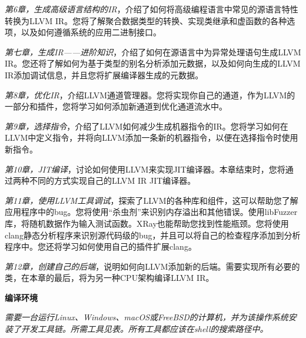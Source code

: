 \textit{第6章，生成高级语言结构的IR}，介绍了如何将高级编程语言中常见的源语言特性转换为LLVM IR。您将了解聚合数据类型的转换、实现类继承和虚函数的各种选项，以及如何遵循系统的应用二进制接口。\par

\textit{第七章，生成IR——进阶知识}，介绍了如何在源语言中为异常处理语句生成LLVM IR。您还将了解如何为基于类型的别名分析添加元数据，以及如何向生成的LLVM IR添加调试信息，并且您将扩展编译器生成的元数据。\par

\textit{第8章，优化IR}，介绍LLVM通道管理器。您将实现你自己的通道，作为LLVM的一部分和插件，您将学习如何添加新通道到优化通道流水中。\par

\textit{第9章，选择指令}，介绍了LLVM如何减少生成机器指令的IR。您将学习如何在LLVM中定义指令，并将向LLVM添加一条新的机器指令，以便在选择指令时使用新指令。\par

\textit{第10章，JIT编译}，讨论如何使用LLVM来实现JIT编译器。本章结束时，您将通过两种不同的方式实现自己的LLVM IR JIT编译器。\par

\textit{第11章，使用LLVM工具调试}，探索了LLVM的各种库和组件，这可以帮助您了解应用程序中的bug。您将使用“杀虫剂”来识别内存溢出和其他错误。使用libFuzzer库，将随机数据作为输入测试函数。XRay也能帮助您找到性能瓶颈。您将使用clang静态分析程序来识别源代码级的bug，并且可以将自己的检查程序添加到分析程序中。您还将学习如何使用自己的插件扩展clang。\par

\textit{第12章，创建自己的后端}，说明如何向LLVM添加新的后端。需要实现所有必要的类，在本章的最后，将为另一种CPU架构编译LLVM IR。\par

\hspace*{\fill} \par %
\textbf{编译环境}

\textit{需要一台运行Linux、Windows、macOS或FreeBSD的计算机，并为该操作系统安装了开发工具链。所需工具见表。所有工具都应该在shell的搜索路径中。}\par

